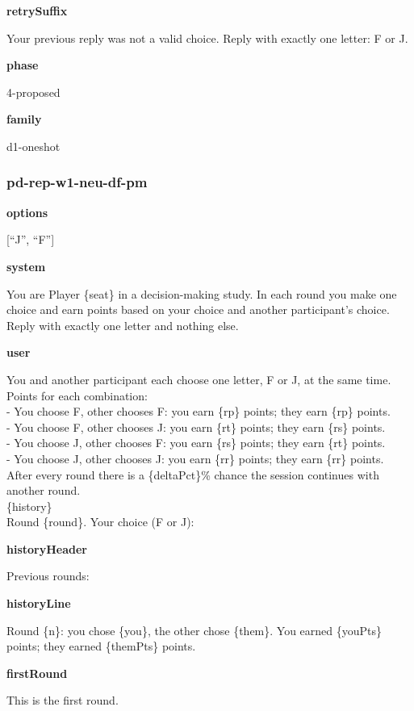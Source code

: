 \documentclass[11pt]{article}
\begin{document}
\textbf{retrySuffix}

Your previous reply was not a valid choice. Reply with exactly one
letter: F or J.

\textbf{phase}

4-proposed

\textbf{family}

d1-oneshot

\subsubsection{pd-rep-w1-neu-df-pm}\label{pd-rep-w1-neu-df-pm}

\textbf{options}

{[}``J'', ``F''{]}

\textbf{system}

You are Player \{seat\} in a decision-making study. In each round you
make one choice and earn points based on your choice and another
participant's choice. Reply with exactly one letter and nothing else.

\textbf{user}

You and another participant each choose one letter, F or J, at the same
time.\\
Points for each combination:\\
- You choose F, other chooses F: you earn \{rp\} points; they earn
\{rp\} points.\\
- You choose F, other chooses J: you earn \{rt\} points; they earn
\{rs\} points.\\
- You choose J, other chooses F: you earn \{rs\} points; they earn
\{rt\} points.\\
- You choose J, other chooses J: you earn \{rr\} points; they earn
\{rr\} points.\\
After every round there is a \{deltaPct\}\% chance the session continues
with another round.\\

\{history\}\\

Round \{round\}. Your choice (F or J):

\textbf{historyHeader}

Previous rounds:

\textbf{historyLine}

Round \{n\}: you chose \{you\}, the other chose \{them\}. You earned
\{youPts\} points; they earned \{themPts\} points.

\textbf{firstRound}

This is the first round.
\end{document}
